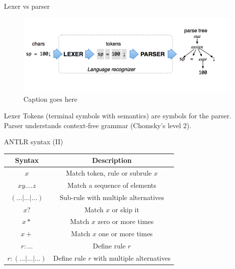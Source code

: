 \documentclass{beamer}
\begin{document}
\begin{frame}{Lexer vs parser}
	
\begin{figure}
\includegraphics[width=\textwidth]{img/lexer_parser_scheme}
\vskip -1.2cm
\caption{\label{fig:your-figure}Caption goes here\footnotemark}
\end{figure}
	
	
	
	
	
	\begin{block}{Lexer}
		Tokens (terminal symbols with semantics) are symbols for the parser. Parser understands context-free grammar (Chomsky's level 2).
	\end{block}


\end{frame}

\begin{frame}{ANTLR syntax (II)}
	\begin{table}[H]
		\begin{tabular}{c|c}
			\textbf{Syntax} & \textbf{Description} \\
			\hline
			$x$ & Match token, rule or subrule $x$ \\
			$x y ....z$ & Match a sequence of elements \\
			$(...|...|...)$ & Sub-rule with multiple alternatives \\
			$x?$ & Match $x$ or skip it \\
			$x*$ & Match $x$ zero or more times \\
			$x+$ & Match $x$ one or more times \\
			$r: ...$ & Define rule $r$ \\
			$r: (...|...|...)$ & Define rule $r$ with multiple alternatives
		\end{tabular}
	\end{table}
\end{frame}
\end{document}
